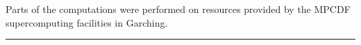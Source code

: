 \documentclass[fleqn,usenatbib,useAMS]{mnras}
\begin{document}
Parts of the computations were performed on resources provided by the MPCDF supercomputing facilities in Garching.







\newpage
\noindent \rule{8.5cm}{1pt}

\noindent





\bsp	%
\label{lastpage}
\end{document}
